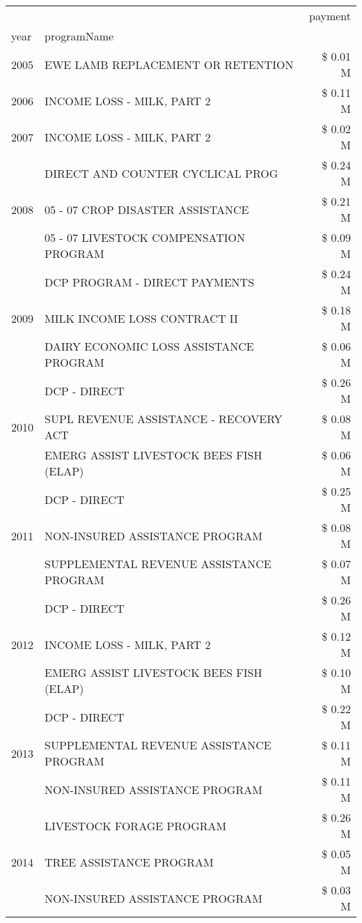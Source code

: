 \begin{tabular}{llr}
\toprule
 &  & payment \\
year & programName &  \\
\midrule
2005 & EWE LAMB REPLACEMENT OR RETENTION & \$ 0.01 M \\
\cline{1-3}
2006 & INCOME LOSS - MILK, PART 2 & \$ 0.11 M \\
\cline{1-3}
2007 & INCOME LOSS - MILK, PART 2 & \$ 0.02 M \\
\cline{1-3}
\multirow[t]{3}{*}{2008} & DIRECT AND COUNTER CYCLICAL PROG & \$ 0.24 M \\
 & 05 - 07 CROP DISASTER ASSISTANCE & \$ 0.21 M \\
 & 05 - 07 LIVESTOCK COMPENSATION PROGRAM & \$ 0.09 M \\
\cline{1-3}
\multirow[t]{3}{*}{2009} & DCP PROGRAM - DIRECT PAYMENTS & \$ 0.24 M \\
 & MILK INCOME LOSS CONTRACT II & \$ 0.18 M \\
 & DAIRY ECONOMIC LOSS ASSISTANCE PROGRAM & \$ 0.06 M \\
\cline{1-3}
\multirow[t]{3}{*}{2010} & DCP - DIRECT & \$ 0.26 M \\
 & SUPL REVENUE ASSISTANCE - RECOVERY ACT & \$ 0.08 M \\
 & EMERG ASSIST LIVESTOCK BEES FISH (ELAP) & \$ 0.06 M \\
\cline{1-3}
\multirow[t]{3}{*}{2011} & DCP - DIRECT & \$ 0.25 M \\
 & NON-INSURED ASSISTANCE PROGRAM & \$ 0.08 M \\
 & SUPPLEMENTAL REVENUE ASSISTANCE PROGRAM & \$ 0.07 M \\
\cline{1-3}
\multirow[t]{3}{*}{2012} & DCP - DIRECT & \$ 0.26 M \\
 & INCOME LOSS - MILK, PART 2 & \$ 0.12 M \\
 & EMERG ASSIST LIVESTOCK BEES FISH (ELAP) & \$ 0.10 M \\
\cline{1-3}
\multirow[t]{3}{*}{2013} & DCP - DIRECT & \$ 0.22 M \\
 & SUPPLEMENTAL REVENUE ASSISTANCE PROGRAM & \$ 0.11 M \\
 & NON-INSURED ASSISTANCE PROGRAM & \$ 0.11 M \\
\cline{1-3}
\multirow[t]{3}{*}{2014} & LIVESTOCK FORAGE PROGRAM & \$ 0.26 M \\
 & TREE ASSISTANCE PROGRAM & \$ 0.05 M \\
 & NON-INSURED ASSISTANCE PROGRAM & \$ 0.03 M \\
\cline{1-3}

\end{tabular}

